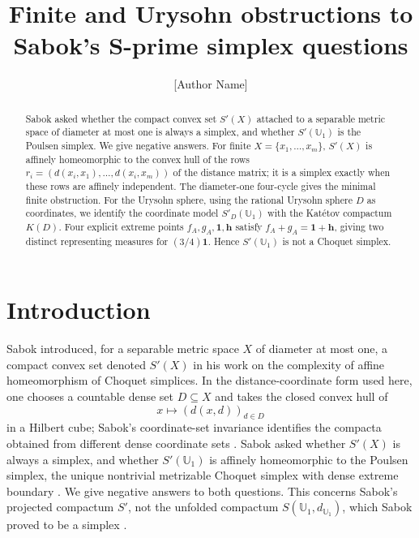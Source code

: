 \documentclass{proc-l}
\numberwithin{equation}{section}
\theoremstyle{definition}
\theoremstyle{remark}
\begin{document}
\title[Finite and Urysohn obstructions to S-prime]{Finite and Urysohn obstructions to Sabok's S-prime simplex questions}

\author{[Author Name]}
\address{[Department], [University], [Postal Address]}
\date{}

\begin{abstract}
Sabok asked whether the compact convex set \(S'(X)\) attached to a separable
metric space of diameter at most one is always a simplex, and whether
\(S'(\mathbb U_1)\) is the Poulsen simplex.  We give negative answers.  For
finite \(X=\{x_1,\ldots,x_m\}\), \(S'(X)\) is affinely homeomorphic to the
convex hull of the rows \(r_i=(d(x_i,x_1),\ldots,d(x_i,x_m))\) of the distance
matrix; it is a simplex exactly when these rows are affinely independent.  The
diameter-one four-cycle gives the minimal finite obstruction.  For the Urysohn
sphere, using the rational Urysohn sphere \(D\) as coordinates, we identify the
coordinate model \(S'_D(\mathbb U_1)\) with the Kat\'etov compactum \(K(D)\).
Four explicit extreme points \(f_A,g_A,\mathbf 1,\mathbf h\) satisfy
\(f_A+g_A=\mathbf 1+\mathbf h\), giving two distinct representing measures for
\((3/4)\mathbf 1\).  Hence \(S'(\mathbb U_1)\) is not a Choquet simplex.
\end{abstract}

\maketitle


\section{Introduction}

Sabok introduced, for a separable metric space \(X\) of diameter at most one, a
compact convex set denoted \(S'(X)\) in his work on the complexity of affine
homeomorphism of Choquet simplices.  In the distance-coordinate form used here,
one chooses a countable dense set \(D\subseteq X\) and takes the closed convex
hull of
\[
        x\longmapsto (d(x,d))_{d\in D}
\]
in a Hilbert cube; Sabok's coordinate-set invariance identifies the compacta
obtained from different dense coordinate sets \cite[Proposition~5.11]{Sabok2016}.
Sabok asked \cite[Question~9.4]{Sabok2016} whether \(S'(X)\) is always a
simplex, and whether \(S'(\mathbb U_1)\) is affinely homeomorphic to the Poulsen
simplex, the unique nontrivial metrizable Choquet simplex with dense extreme
boundary \cite{Poulsen1961,LindenstraussOlsenSternfeld1978}.  We give negative
answers to both questions.  This concerns Sabok's projected compactum \(S'\),
not the unfolded compactum \(S(\mathbb U_1,d_{\mathbb U_1})\), which Sabok
proved to be a simplex \cite[Proposition~5.19]{Sabok2016}.
\end{document}
